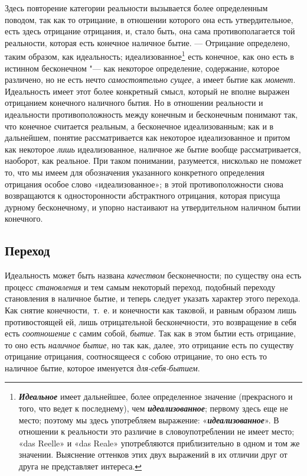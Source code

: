 Здесь повторение категории реальности вызывается более определенным поводом,
так как то отрицание, в отношении которого она есть утвердительное, есть
здесь отрицание отрицания, и, стало быть, она сама противополагается той
реальности, которая есть конечное наличное бытие. — Отрицание определено,
таким образом, как идеальность;
идеализованное\footnote{
{\em\bfseries Идеальное}
имеет дальнейшее, более определенное значение (прекрасного и
того, что ведет к последнему), чем
{\em\bfseries идеализованное}; первому
здесь еще не место; поэтому мы здесь употребляем выражение:
«{\em\bfseries идеализованное}». В
отношении к реальности это различие в словоупотреблении не имеет место;
«das Reelle» и «das Reale» употребляются приблизительно в одном и том же
значении. Выяснение оттенков этих двух выражений в их отличии друг от друга
не представляет интереса.}
есть конечное, как оно есть в истинном
бесконечном "--- как некоторое определение, содержание, которое различено, но
не есть нечто {\em самостоятельно сущее}, а имеет бытие
как {\em момент}. Идеальность имеет этот более
конкретный смысл, который не вполне выражен отрицанием конечного наличного
бытия. Но в отношении реальности и идеальности противоположность между
конечным и бесконечным понимают так, что конечное считается реальным, а
бесконечное идеализованным; как и в дальнейшем, понятие рассматривается как
некоторое идеализованное и притом как некоторое
{\em лишь} идеализованное, наличное же бытие вообще
рассматривается, наоборот, как реальное. При таком понимании, разумеется,
нисколько не поможет то, что мы имеем для обозначения указанного
конкретного определения отрицания особое слово «идеализованное»; в этой
противоположности снова возвращаются к односторонности абстрактного
отрицания, которая присуща дурному бесконечному, и упорно настаивают на
утвердительном наличном бытии конечного.

\subsection[Переход]{Переход}
Идеальность может быть названа {\em качеством}
бесконечности; по существу она есть процесс
{\em становления} и тем самым некоторый переход,
подобный переходу становления в наличное бытие, и теперь следует указать
характер этого перехода. Как снятие конечности,~т.~е. и конечности как
таковой, и равным образом лишь противостоящей ей, лишь отрицательной
бесконечности, это возвращение в себя есть
{\em соотношение} с самим собой,
{\em бытие}. Так как в этом бытии есть отрицание, то
оно есть {\em наличное бытие}, но так как, далее, это
отрицание есть по существу отрицание отрицания, соотносящееся с собою
отрицание, то оно есть то наличное бытие, которое именуется
{\em для-себя-бытием}.

